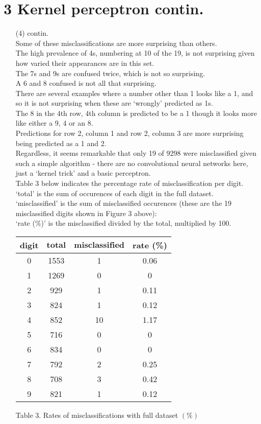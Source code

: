\documentclass[a4paper,12pt]{article}
\begin{document}
\section*{3 Kernel perceptron contin.}
\begin{enumerate}

\item[(4)] contin.\\
Some of these misclassifications are more surprising than others. \\
The high prevalence of 4s, numbering at 10 of the 19, is not surprising given how varied their appearances are in this set.\\
The 7s and 9s are confused twice, which is not so surprising.\\
A 6 and 8 confused is not all that surprising.\\
There are several examples where a number other than 1 looks like a 1, and so it is not surprising when these are `wrongly' predicted as 1s.\\
The 8 in the 4th row, 4th column is predicted to be a 1 though it looks more like either a 9, 4 or an 8.\\ 
Predictions for row 2, column 1 and row 2, column 3 are more surprising being predicted as a 1 and 2.\\
Regardless, it seems remarkable that only 19 of 9298 were misclassified given such a simple algorithm - there are no convolutional neural networks here, just a `kernel trick' and a basic perceptron.\\

Table 3 below indicates the percentage rate of misclassification per digit. \\
`total' is the sum of occurences of each digit in the full dataset. \\
`misclassified' is the sum of misclassified occurences (these are the 19 misclassified digits shown in Figure 3 above):\\
`rate (\%)' is the misclassified divided by the total, multiplied by 100. 

\begin{tabular}{|c|c|c|c|}
\hline
\textbf{digit}&$\textbf{total}$&$\textbf{misclassified}$&\textbf{rate} (\%)\\
\hline
0&1553&1&0.06\\
\hline
1&1269&0&0\\
\hline
2&929&1&0.11\\
\hline
3&824&1&0.12\\
\hline
4&852&10&1.17\\
\hline
5&716&0&0\\
\hline
6&834&0&0\\
\hline
7&792&2&0.25\\
\hline
8&708&3&0.42\\
\hline
9&821&1&0.12\\
\hline
\end{tabular}\par 
Table 3. Rates of misclassifications with full dataset $(\%)$

\end{enumerate}
\clearpage
\end{document}
